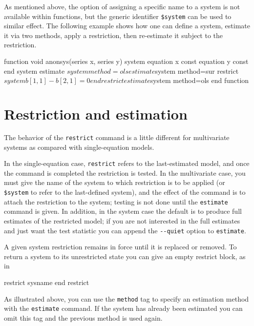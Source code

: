 As mentioned above, the option of assigning a specific name to a
system is not available within functions, but the generic identifier
\verb|$system| can be used to similar effect. The following example
shows how one can define a system, estimate it via two methods, apply
a restriction, then re-estimate it subject to the restriction.

\begin{code}
function void anonsys(series x, series y)
     system
         equation x const
         equation y const
     end system
     estimate $system method=ols
     estimate $system method=sur
     restrict $system
         b[1,1] - b[2,1] = 0
     end restrict
     estimate $system method=ols
end function
\end{code}

\section{Restriction and estimation}
\label{sec:sys-est}

The behavior of the \texttt{restrict} command is a little different
for multivariate systems as compared with single-equation models.

In the single-equation case, \texttt{restrict} refers to the
last-estimated model, and once the command is completed the
restriction is tested. In the multivariate case, you must give the
name of the system to which restriction is to be applied (or
\verb|$system| to refer to the last-defined system), and the effect of
the command is to attach the restriction to the system; testing is not
done until the \texttt{estimate} command is given.  In addition, in
the system case the default is to produce full estimates of the
restricted model; if you are not interested in the full estimates and
just want the test statistic you can append the \verb|--quiet| 
option to \texttt{estimate}.

A given system restriction remains in force until it is replaced or
removed. To return a system to its unrestricted state you can give
an empty restrict block, as in

\begin{code}
restrict sysname
end restrict
\end{code}

As illustrated above, you can use the \texttt{method} tag to specify
an estimation method with the \texttt{estimate} command. If the system
has already been estimated you can omit this tag and the previous
method is used again. 

